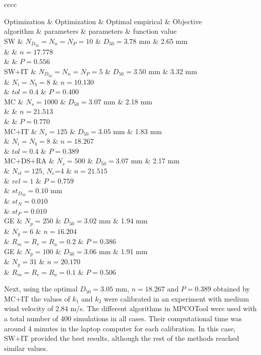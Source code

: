 \documentclass[review,authoryear]{elsarticle}
\newcommand{\TABLE}[5]
{
	\begin{table}[ht!]
		\centering
		\caption{#4.\label{#5}}
		#1
		\tabulinesep=0.9mm
		\begin{tabu}{#2}
			#3
		\end{tabu}
	\end{table}
}
\begin{document}
\TABLE{\footnotesize}{cccc}
{
	Optimization & Optimization & Optimal empirical & Objective
	\\ algorithm & parameters & parameters & function value
	\\ \hline
	SW & $N_{D_{50}}=N_n=N_P=10$ & $D_{50}=3.78$ mm & 2.65 mm
	\\ & & $n=17.778$
	\\ & & $P=0.556$
	\\ \hline
	SW+IT & $N_{D_{50}}=N_n=N_P=5$ & $D_{50}=3.50$ mm & 3.32 mm
	\\ & $N_i=N_b=8$ & $n=10.130$
	\\ & $tol=0.4$ & $P=0.400$
	\\ \hline
	MC & $N_s=1000$ & $D_{50}=3.07$ mm & 2.18 mm
	\\ & & $n=21.513$
	\\ & & $P=0.770$
	\\ \hline
	MC+IT & $N_s=125$ & $D_{50}=3.05$ mm & 1.83 mm
	\\ & $N_i=N_b=8$ & $n=18.267$
	\\ & $tol=0.4$ & $P=0.389$
	\\ \hline
	MC+DS+RA & $N_s=500$ & $D_{50}=3.07$ mm & 2.17 mm
	\\ & $N_{st}=125$, $N_e$=4 & $n=21.515$
	\\ & $rel=1$ & $P=0.759$
	\\ & $st_{D_{50}}=0.10$ mm
	\\ & $st_N=0.010$
	\\ & $st_P=0.010$
	\\ \hline
	GE & $N_p=250$ & $D_{50}=3.02$ mm & 1.94 mm
	\\ & $N_g=6$ & $n=16.204$
	\\ & $R_m=R_r=R_a=0.2$ & $P=0.386$
	\\ \hline
	GE & $N_p=100$ & $D_{50}=3.06$ mm & 1.91 mm
	\\ & $N_g=31$ & $n=20.170$
	\\ & $R_m=R_r=R_a=0.1$ & $P=0.506$
	\\ \hline
}{Optimal empirical parameters and value of the evaluation function in the case of the sprinkler irrigation
using different optimization algorithms in MPCOTool with the same number of total simulations ($N_{total}=1000$)}{TabSprinklerI}

Next, using the optimal $D_{50}=3.05$ mm, $n=18.267$ and $P=0.389$ obtained by MC+IT the values of $k_1$ and $k_2$ were calibrated in an experiment with medium wind velocity of 2.84 m/s. The different algorithms in MPCOTool were used with a total number of 400 simulations in all cases. Their computational time was around 4 minutes in the laptop computer for each calibration. In this case, SW+IT provided the best results, although the rest of the methods reached similar values.
\end{document}
